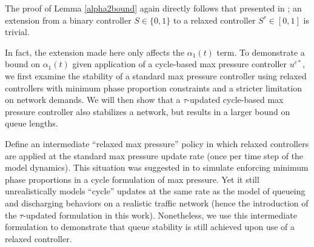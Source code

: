 The proof of Lemma \ref{alpha2bound} again directly follows that presented in \cite{MaxPressureStochastic}; an extension from a binary controller $S\in \{0,1\}$ to a relaxed controller $S^r\in [0,1]$ is trivial. 

In fact, the extension made here only affects the $\alpha_1 (t)$ term. To demonstrate a bound on $\alpha_1(t)$ given application of a cycle-based max pressure controller $u^{c*}$, we first examine the stability of a standard max pressure controller using relaxed controllers with minimum phase proportion constraints and a stricter limitation on network demands. We will then show that a $\tau$-updated cycle-based max pressure controller also stabilizes a network, but results in a larger bound on queue lengths. 

Define an intermediate ``relaxed max pressure'' policy in which relaxed controllers are applied at the standard max pressure update rate (once per time step of the model dynamics). 
This situation was suggested in \cite{MaxPressureStochastic} to simulate enforcing minimum phase proportions in a cycle formulation of max pressure. Yet it still unrealistically models ``cycle'' updates at the same rate as the model of queueing and discharging behaviors on a realistic traffic network (hence the introduction of the $\tau$-updated formulation in this work). Nonetheless, we use this intermediate formulation to demonstrate that queue stability is still achieved upon use of a relaxed controller. 

